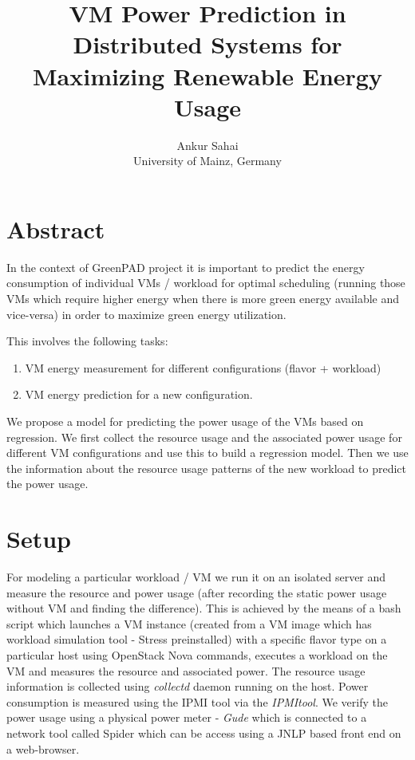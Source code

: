 \documentclass[singlecolumn,letterpaper,12pt]{article}
\begin{document}
\date{}

\title{VM Power Prediction in Distributed Systems for Maximizing Renewable Energy Usage}
\author{
Ankur Sahai \\
University of Mainz, Germany
}


\setlength{\parindent}{10pt}
\setlength{\parskip}{1ex} 
\maketitle
\thispagestyle{empty}
\noindent
\section{Abstract}
\label{sec:abstract}


In the context of GreenPAD project it is important to predict the energy consumption of individual VMs / workload for optimal scheduling (running those VMs which require higher energy when there is more green energy available and vice-versa) in order to maximize green energy utilization.

This involves the following tasks:

\begin{enumerate}
\item VM energy measurement for different configurations (flavor + workload)
\item VM energy prediction for a new configuration.
\end{enumerate}
We propose a model for predicting the power usage of the VMs based on regression. We first collect the resource usage and the associated power usage for different VM configurations and use this to build a regression model. Then we use the information about the resource usage patterns of the new workload to predict the power usage.

\section{Setup}
\label{sec:setup}


For modeling a particular workload / VM we run it on an isolated server and measure the resource and power usage (after recording the static power usage without VM and finding the difference). This is achieved by the means of a bash script which launches a VM instance (created from a VM image which has workload simulation tool - Stress preinstalled) with a specific flavor type on a particular host using OpenStack Nova commands, executes a workload on the VM and measures the resource and associated power. The resource usage information is collected using \emph{collectd} daemon running on the host. Power consumption is measured using the IPMI tool via the \emph{IPMItool}. We verify the power usage using a physical power meter - \emph{Gude} which is connected to a network tool called Spider which can be access using a JNLP based front end on a web-browser.
\end{document}
